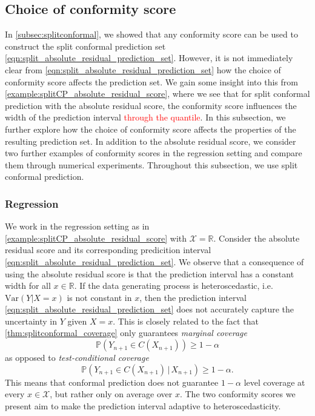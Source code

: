 \documentclass[11pt, titlepage]{article} %
\newcommand{\R}{\mathrm}
\newcommand{\Prob}[1]{\mathbb{P}\left( #1 \right)}
\numberwithin{equation}{section}
\theoremstyle{definition}
\numberwithin{theorem}{section}
\numberwithin{lemma}{section}
\numberwithin{corollary}{section}
\numberwithin{proposition}{section}
\numberwithin{definition}{section}
\numberwithin{remark}{section}
\begin{document}
\subsection{Choice of conformity score}
\label{subsec:conformityscore}

In \cref{subsec:splitconformal}, we showed that any conformity score can be used to construct the split conformal prediction set \eqref{eqn:split_absolute_residual_prediction_set}. However, it is not immediately clear from \eqref{eqn:split_absolute_residual_prediction_set} how the choice of conformity score affects the prediction set. We gain some insight into this from \cref{example:splitCP_absolute_residual_score}, where we see that for split conformal prediction with the absolute residual score, the conformity score influences the width of the prediction interval \textcolor{red}{through the quantile}. In this subsection, we further explore how the choice of conformity score affects the properties of the resulting prediction set. In addition to the absolute residual score, we consider two further examples of conformity scores in the regression setting and compare them through numerical experiments. Throughout this subsection, we use split conformal prediction.

\subsubsection{Regression}

We work in the regression setting as in \cref{example:splitCP_absolute_residual_score} with \(\mathcal{X} = \mathbb{R}\). Consider the absolute residual score and its corresponding predicition interval \eqref{eqn:split_absolute_residual_prediction_set}. We observe that a consequence of using the absolute residual score is that the prediction interval has a constant width for all \(x \in \mathbb{R}.\) If the data generating process is heteroscedastic, i.e. \(\R{Var}(Y | X = x)\) is not constant in \(x\), then the prediction interval \eqref{eqn:split_absolute_residual_prediction_set} does not accurately capture the uncertainty in \(Y\) given \(X = x\). This is closely related to the fact that \cref{thm:splitconformal_coverage} only guarantees \textit{marginal coverage} \[\Prob{Y_{n+1} \in C(X_{n+1}) } \geq 1-\alpha\] as opposed to \textit{test-conditional coverage} \[\Prob{Y_{n+1} \in C(X_{n+1}) \, | \, X_{n+1} } \geq 1-\alpha.\] This means that conformal prediction does not guarantee \(1-\alpha\) level coverage at every \(x \in \mathcal{X}\), but rather only on average over \(x\). The two conformity scores we present aim to make the prediction interval adaptive to heteroscedasticity. 
\end{document}

